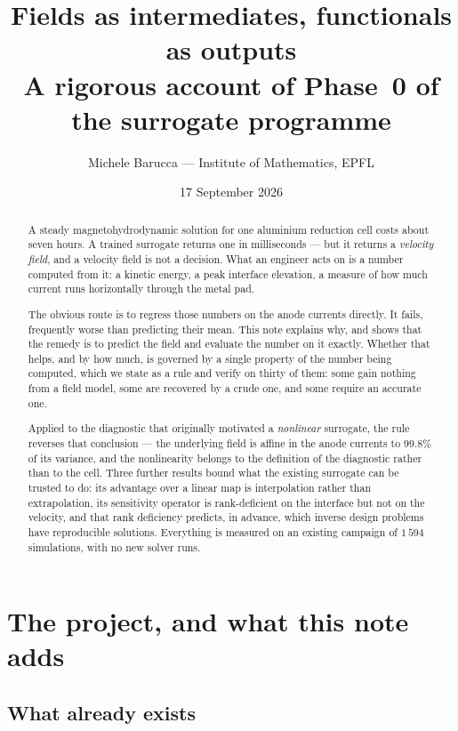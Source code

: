 \documentclass[11pt,a4paper]{article}
\title{\textbf{Fields as intermediates, functionals as outputs}\\[2pt]
\large A rigorous account of Phase~0 of the surrogate programme}
\author{Michele Barucca --- Institute of Mathematics, EPFL}
\date{17 September 2026}
\theoremstyle{plain}
\theoremstyle{definition}
\theoremstyle{remark}
\begin{document}
\maketitle

\begin{abstract}
\noindent
A steady magnetohydrodynamic solution for one aluminium reduction cell costs
about seven hours. A trained surrogate returns one in milliseconds --- but it
returns a \emph{velocity field}, and a velocity field is not a decision. What an
engineer acts on is a number computed from it: a kinetic energy, a peak
interface elevation, a measure of how much current runs horizontally through the
metal pad.

The obvious route is to regress those numbers on the anode currents directly.
It fails, frequently worse than predicting their mean. This note explains why,
and shows that the remedy is to predict the field and evaluate the number on it
exactly. Whether that helps, and by how much, is governed by a single property
of the number being computed, which we state as a rule and verify on thirty of
them: some gain nothing from a field model, some are recovered by a crude one,
and some require an accurate one.

Applied to the diagnostic that originally motivated a \emph{nonlinear}
surrogate, the rule reverses that conclusion --- the underlying field is affine
in the anode currents to $99.8\%$ of its variance, and the nonlinearity belongs
to the definition of the diagnostic rather than to the cell. Three further
results bound what the existing surrogate can be trusted to do: its advantage
over a linear map is interpolation rather than extrapolation, its sensitivity
operator is rank-deficient on the interface but not on the velocity, and that
rank deficiency predicts, in advance, which inverse design problems have
reproducible solutions. Everything is measured on an existing campaign of
$1\,594$ simulations, with no new solver runs.
\end{abstract}

\tableofcontents

\section{The project, and what this note adds}
\label{sec:notation}

\subsection{What already exists}
\label{auto:what-already-exists}
\end{document}
